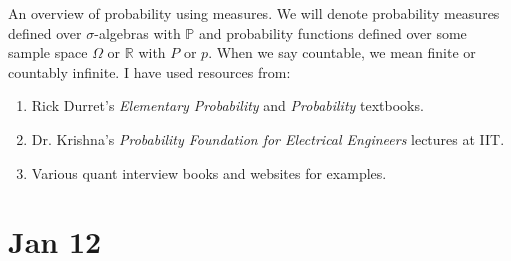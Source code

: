 An overview of probability using measures. We will denote probability measures defined over $\sigma$-algebras with $\mathbb{P}$ and probability functions defined over some sample space $\Omega$ or $\mathbb{R}$ with $P$ or $p$. When we say countable, we mean finite or countably infinite. I have used resources from: 
\begin{enumerate}
  \item Rick Durret's \textit{Elementary Probability} and \textit{Probability} textbooks. 
  \item Dr. Krishna's \textit{Probability Foundation for Electrical Engineers} lectures at IIT. 
  \item Various quant interview books and websites for examples. 
\end{enumerate}


\section{Jan 12}  

